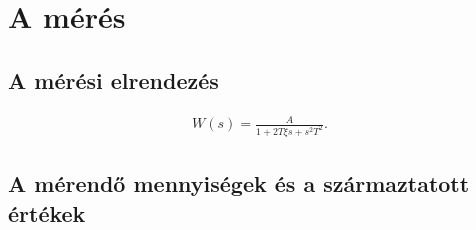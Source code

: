 \chapter{A mérés}
\section{A mérési elrendezés}
\begin{align}
W(s)=\frac{A}{1+2T\xi s+s^2T^2}.
\end{align}

\section{A mérendő mennyiségek és a származtatott értékek}










